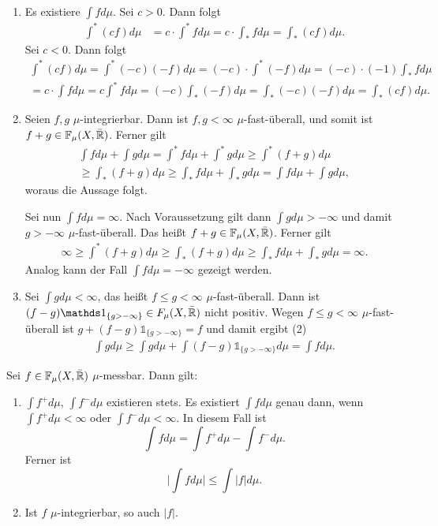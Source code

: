 \documentclass[a4paper,twoside,DIV15,BCOR12mm]{scrbook}
\newcommand{\ind}{\mathds 1}
\begin{document}
\begin{beweis}
\begin{enumerate}
\item Es existiere $\int fd\mu$. Sei $c>0$. Dann folgt
\begin{align*}
\int^* (cf)d\mu 
&= c\cdot \int^*fd\mu = c\cdot \int_* fd\mu = \int_* (cf)d\mu.
\end{align*}
Sei $c<0$. Dann folgt
\begin{multline*}
\int^* (cf)d\mu 
= \int^*(-c)(-f)d\mu
= (-c)\cdot \int^*(-f)d\mu
= (-c) \cdot (-1) \int_* fd\mu 
\\
= c\cdot \int fd\mu 
= c\int^* fd\mu 
= (-c)\int_*(-f) d\mu
= \int_*(-c)(-f) d\mu
= \int_* (cf) d\mu .
\end{multline*}
\item Seien $f,g$ $\mu$-integrierbar. Dann ist $f,g<\infty$ $\mu$-fast-überall, und somit ist $f+g\in \mathbb F_\mu(X,\bar{\mathbb{R}})$. Ferner gilt
\begin{multline*}
\int fd\mu + \int gd\mu 
= \int^* fd\mu + \int^* gd\mu
\ge \int^*(f+g)d\mu \\
\ge \int_*(f+g)d\mu
\ge \int_* fd\mu + \int_* gd\mu
= \int fd\mu + \int gd\mu,
\end{multline*}
woraus die Aussage folgt.

Sei nun $\int fd\mu = \infty$. Nach Voraussetzung gilt dann $\int gd\mu >-\infty$ und damit $g>-\infty$ $\mu$-fast-überall. Das heißt $f+g\in\mathbb F_\mu(X,\bar{\mathbb{R}})$. Ferner gilt
\begin{align*}
\infty \ge \int^*(f+g)d\mu \ge \int_*(f+g)d\mu \ge \int_*f d\mu + \int_* gd\mu = \infty.
\end{align*}
Analog kann der Fall $\int fd\mu=-\infty$ gezeigt werden.
\item Sei $\int gd\mu <\infty$, das heißt $f\le g <\infty$ $\mu$-fast-überall. Dann ist 
$(f-g)\ind_{\{g>-\infty\}}\in F_\mu(X,\bar\MdR)$ nicht positiv. Wegen $f\le g <\infty$ $\mu$-fast-überall 
ist $g+(f-g)\ind_{\{g>-\infty\}}=f$ und damit ergibt (2)
\begin{align*}
\int gd\mu \ge \int gd\mu + \int (f-g)\ind_{\{g>-\infty\}}d\mu = \int fd\mu.
\end{align*}
\end{enumerate}
\end{beweis}

\begin{satz}
Sei $f\in\mathbb F_\mu(X,\bar{\mathbb{R}})$ $\mu$-messbar. Dann gilt:
\begin{enumerate}
\item $\int f^+ d\mu$, $\int f^- d\mu$ existieren stets. Es existiert $\int fd\mu$ genau dann, wenn $\int f^+d \mu <\infty$ oder $\int f^- d\mu<\infty$. In diesem Fall ist 
\[
\int fd\mu = \int f^+d\mu -\int f^-d\mu.
\]
Ferner ist
\[
\Big|\int fd\mu\Big| \le \int |f|d\mu .
\]
\item Ist $f$ $\mu$-integrierbar, so auch $|f|$. 
\end{enumerate}
\end{satz}
\end{document}
